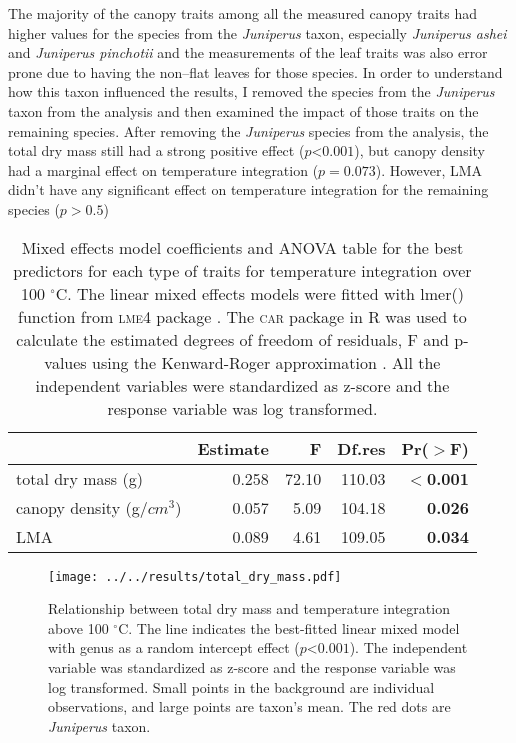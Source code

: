 \documentclass{ttuthes2007}
\newcommand{\pkg}[1]{\textsc{#1}}
\begin{document}
The majority of the canopy traits among all the measured canopy traits had higher values for the species from the \emph{Juniperus} taxon, especially \emph{Juniperus ashei} and \emph{Juniperus pinchotii} and the measurements of the leaf traits was also error prone due to having the non--flat leaves for those species. In order to understand how this taxon influenced the results, I removed the species from the \emph{Juniperus} taxon from the analysis and then examined the impact of those traits on the remaining species. After removing the \emph{Juniperus} species from the analysis, the total dry mass still had a strong positive effect ($p $<$ 0.001$), but canopy density had a marginal effect on temperature integration ($p = 0.073$). However, LMA didn't have any significant effect on temperature integration for the remaining species ($p > 0.5$) 



\begin{table}
\centering
\caption{Mixed effects model coefficients and ANOVA table for the best predictors for each type of traits for temperature integration over 100 $^{\circ}$C. The linear mixed effects models were fitted with lmer() function from \pkg{lme4} package \citep{bates2009package}. The \pkg{car} package in R \citep{fox2013hypothesis} was used to calculate the estimated degrees of freedom of residuals, F and p-values using the Kenward-Roger approximation \citep{kenward1997small}. All the independent variables were standardized  as z-score and the response variable was log transformed.}
\vspace{0.5 cm}
\begin{tabular}{lrrrr}
  \hline
 &  Estimate & F  & Df.res & Pr($>$F) \\ 
  \hline 
  total dry mass (g) & 0.258 & 72.10  & 110.03 & \textbf{$<$0.001} \\ 
  canopy density (g/{$cm^3$}) & 0.057 & 5.09  & 104.18 & \textbf{0.026} \\ 
  LMA & 0.089 & 4.61 &  109.05 & \textbf{0.034} \\ 
   \hline
\end{tabular}
\label{tab:fandpstatfortemp}
\end{table}


\begin{figure}[ht]
    \centering
    \texttt{[image: ../../results/total\_dry\_mass.pdf]}
    \caption[Dry mass effect on temperature integration]{\label{fig:dm-tempint}Relationship between total dry mass and temperature integration above 100 $^{\circ}$C. The line indicates the best-fitted linear mixed model with genus as a random intercept effect ($p $<$ 0.001$). The independent variable was standardized  as z-score and the response variable was log transformed. Small points in the background are individual observations, and large points are taxon's mean. The red dots are \emph{Juniperus} taxon.}
\end{figure}
\end{document}
